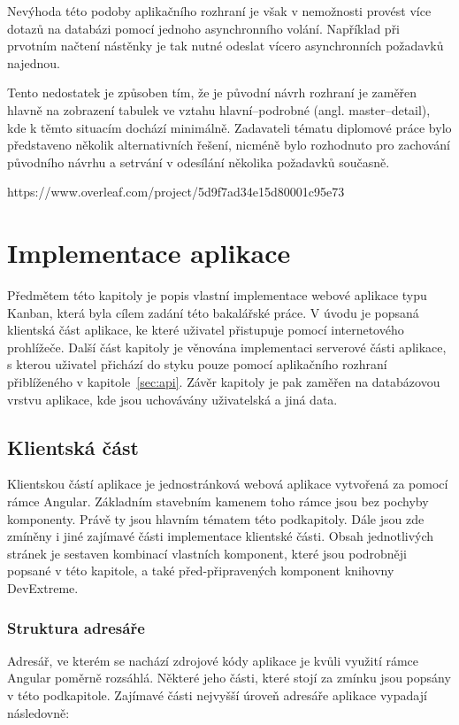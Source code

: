 Nevýhoda této podoby aplikačního rozhraní je však v nemožnosti provést více dotazů na databázi pomocí jednoho asynchronního volání. Například při prvotním načtení nástěnky je tak nutné odeslat vícero asynchronních požadavků najednou.

Tento nedostatek je způsoben tím, že je původní návrh rozhraní je zaměřen hlavně na zobrazení tabulek ve vztahu hlavní--podrobné (angl. master--detail), kde k těmto situacím dochází minimálně. Zadavateli tématu diplomové práce bylo představeno několik alternativních řešení, nicméně bylo rozhodnuto pro zachování původního návrhu a setrvání v odesílání několika požadavků současně. 

https://www.overleaf.com/project/5d9f7ad34e15d80001c95e73
\chapter{Implementace aplikace}
Předmětem této kapitoly je popis vlastní implementace webové aplikace typu Kanban, která byla cílem zadání této bakalářské práce. V úvodu je popsaná klientská část aplikace, ke které uživatel přistupuje pomocí internetového prohlížeče. Další část kapitoly je věnována implementaci serverové části aplikace, s kterou uživatel přichází do styku pouze pomocí aplikačního rozhraní přiblíženého v kapitole~\ref{sec:api}. Závěr kapitoly je pak zaměřen na databázovou vrstvu aplikace, kde jsou uchovávány uživatelská a jiná data.



\section{Klientská část}
Klientskou částí aplikace je jednostránková webová aplikace vytvořená za pomocí rámce Angular. Základním stavebním kamenem toho rámce jsou bez pochyby komponenty. Právě ty jsou hlavním tématem této podkapitoly. Dále jsou zde zmíněny i jiné zajímavé části implementace klientské části. Obsah jednotlivých stránek je sestaven kombinací vlastních komponent, které jsou podrobněji popsané v této kapitole, a také před-připravených komponent knihovny DevExtreme.


\subsection{Struktura adresáře}
Adresář, ve kterém se nachází zdrojové kódy aplikace je kvůli využití rámce Angular poměrně rozsáhlá. Některé jeho části, které stojí za zmínku jsou popsány v této podkapitole. Zajímavé části nejvyšší úroveň adresáře aplikace vypadají následovně:

